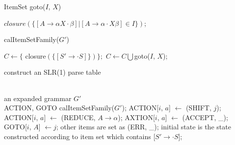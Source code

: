 \documentclass[11pt]{article}
\begin{document}
\begin{algorithm}[h]
    \caption{ItemSet goto($I$, $X$)}
    \label{alg: lr0goto}
    \begin{algorithmic}[1]
    	\RETURN $closure(\{[A \rightarrow \alpha X \cdot \beta]|[A \rightarrow \alpha \cdot X \beta] \in I\})$;
    \end{algorithmic}
\end{algorithm}

\begin{algorithm}[h]
    \caption{calItemSetFamily($G'$)}
    \label{alg: lr0itemsetfamily}
    \begin{algorithmic}[1]
    	\STATE $C \leftarrow \{$ closure$(\{ [S' \rightarrow \cdot S] \}) \};$
    	\REPEAT
    					\STATE $C \leftarrow C \bigcup $goto($I$, $X$);
    				\ENDIF
    			\ENDFOR
    		\ENDFOR
    \end{algorithmic}
\end{algorithm}

\begin{algorithm}[h]         %
\caption{construct an SLR(1) parse table}             %
\label{alg: lr0construct}
\begin{algorithmic}[1]                %
\REQUIRE ~~\\                          %
    an expanded grammar $G'$
\ENSURE ~~\\                           %
	ACTION, GOTO
\STATE calItemSetFamily($G'$);
	\STATE ACTION[$i$, $a$] $\leftarrow$ (SHIFT, $j$);
		\STATE ACTION[$i$, $a$] $\leftarrow$ (REDUCE, $A \rightarrow \alpha$);
	\ENDFOR
{}
	\STATE AXTION[$i$, $a$] $\leftarrow$ (ACCEPT, \_);
\ENDIF
{}
	\STATE GOTO[$i$, $A$] $\leftarrow j$;
\ENDIF
\STATE other items are set as (ERR, \_);
\STATE initial state is the state constructed according to item set which contains [$S' \rightarrow \cdot S$];
\end{algorithmic}
\end{algorithm}
\end{document}
